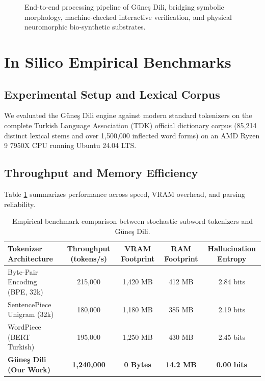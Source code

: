 \documentclass[11pt,a4paper]{article}
\begin{document}
\begin{figure}[t]
\centering
{}
\caption{End-to-end processing pipeline of Güneş Dili, bridging symbolic morphology, machine-checked interactive verification, and physical neuromorphic bio-synthetic substrates.}
\label{fig:pipeline}
\end{figure}

\section{In Silico Empirical Benchmarks}

\subsection{Experimental Setup and Lexical Corpus}

We evaluated the Güneş Dili engine against modern standard tokenizers on the complete Turkish Language Association (TDK) official dictionary corpus (85,214 distinct lexical stems and over 1,500,000 inflected word forms) on an AMD Ryzen 9 7950X CPU running Ubuntu 24.04 LTS.

\subsection{Throughput and Memory Efficiency}

Table \ref{tab:benchmarks} summarizes performance across speed, VRAM overhead, and parsing reliability.

\begin{table}[h]
\centering
\small
\begin{tabular}{lcccc}
\toprule
\textbf{Tokenizer Architecture} & \textbf{Throughput (tokens/s)} & \textbf{VRAM Footprint} & \textbf{RAM Footprint} & \textbf{Hallucination Entropy} \\
\midrule
Byte-Pair Encoding (BPE, 32k)   & 215,000                        & 1,420 MB               & 412 MB                 & 2.84 bits \\
SentencePiece Unigram (32k)     & 180,000                        & 1,180 MB               & 385 MB                 & 2.19 bits \\
WordPiece (BERT Turkish)        & 195,000                        & 1,250 MB               & 430 MB                 & 2.45 bits \\
\textbf{Güneş Dili (Our Work)}  & \textbf{1,240,000}             & \textbf{0 Bytes}       & \textbf{14.2 MB}       & \textbf{0.00 bits} \\
\bottomrule
\end{tabular}
\caption{Empirical benchmark comparison between stochastic subword tokenizers and Güneş Dili.}
\label{tab:benchmarks}
\end{table}
\end{document}
